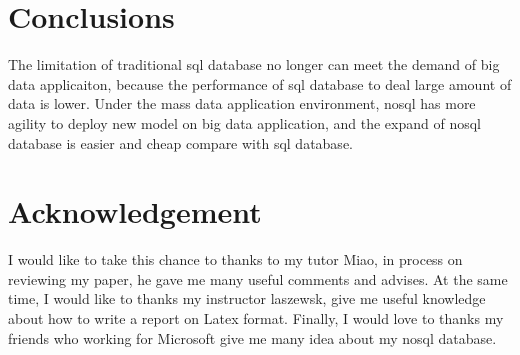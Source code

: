 \documentclass[sigconf]{acmart}
\begin{document}
\section{Conclusions}
The limitation of traditional sql database no longer can meet the demand of big data applicaiton, because the performance of sql database to deal large amount of data is lower. Under the mass data application environment, nosql has more agility to deploy new model on big data application, and the expand of nosql database is easier and cheap compare with sql database.

\section{Acknowledgement}

I would like to  take this chance to thanks to my tutor Miao, in process on reviewing my paper, he gave me many useful comments and advises. At the same time, I would like to thanks my instructor laszewsk, give me useful knowledge about how to write a report on Latex format. Finally, I would love to thanks my friends who working for Microsoft  give me many idea about my nosql database.







 
\end{document}
